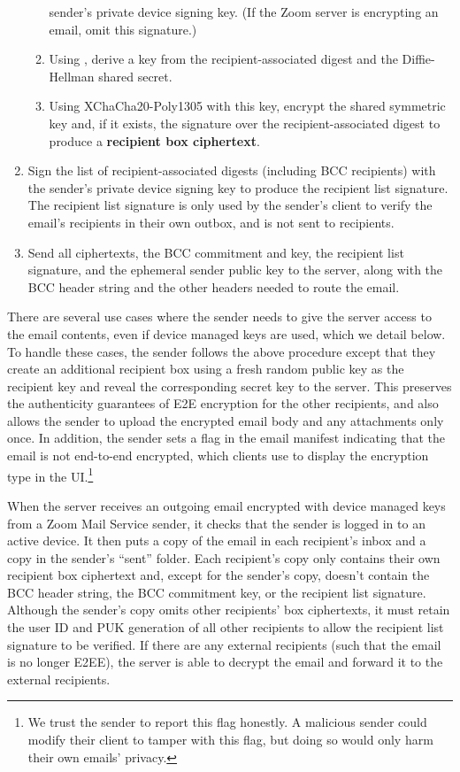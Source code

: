 \begin{enumerate}
\begin{enumerate}
sender's private device signing key. (If the Zoom server is encrypting an email, omit this
signature.)
\item Using \HMACSHATWO, derive a key from the recipient-associated digest and the Diffie-Hellman
shared secret.
\item Using XChaCha20-Poly1305 with this key, encrypt the shared symmetric key and, if it exists,
the signature over the recipient-associated digest to produce a \textbf{recipient box ciphertext}.
\end{enumerate}
\item Sign the list of recipient-associated digests (including BCC recipients) with the sender's
private device signing key to produce the recipient list signature. The recipient list signature is
only used by the sender's client to verify the email's recipients in their own outbox, and is not
sent to recipients.
\item Send all ciphertexts, the BCC commitment and key, the recipient list signature, and the
ephemeral sender public key to the server, along with the BCC header string and the other headers
needed to route the email.
\end{enumerate}

There are several use cases where the sender needs to give the server access to the email contents,
even if device managed keys are used, which we detail below. To handle these cases, the sender
follows the above procedure except that they create an additional recipient box using a fresh random
public key as the recipient key and reveal the corresponding secret key to the server. This
preserves the authenticity guarantees of E2E encryption for the other recipients, and also allows
the sender to upload the encrypted email body and any attachments only once. In addition, the sender
sets a flag in the email manifest indicating that the email is not end-to-end encrypted, which
clients use to display the encryption type in the UI.\footnote{We trust the sender to report this
flag honestly. A malicious sender could modify their client to tamper with this flag, but doing so
would only harm their own emails' privacy.}

When the server receives an outgoing email encrypted with device managed keys from a Zoom Mail
Service sender, it checks that the sender is logged in to an active device. It then puts a copy of
the email in each recipient's inbox and a copy in the sender's ``sent'' folder. Each recipient's
copy only contains their own recipient box ciphertext and, except for the sender's copy, doesn't
contain the BCC header string, the BCC commitment key, or the recipient list signature. Although the
sender's copy omits other recipients' box ciphertexts, it must retain the user ID and PUK generation
of all other recipients to allow the recipient list signature to be verified. If there are any
external recipients (such that the email is no longer E2EE), the server is able to decrypt the email
and forward it to the external recipients.


